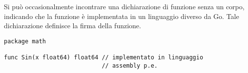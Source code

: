 Si può occasionalmente incontrare una dichiarazione di funzione senza un corpo, indicando che la funzione è implementata in un linguaggio diverso da Go.
Tale dichiarazione definisce la firma della funzione.
\begin{lstlisting}[frame=single, label={lst:lstlisting4-1.4}]
package math

func Sin(x float64) float64 // implementato in linguaggio
                            // assembly p.e.
\end{lstlisting}